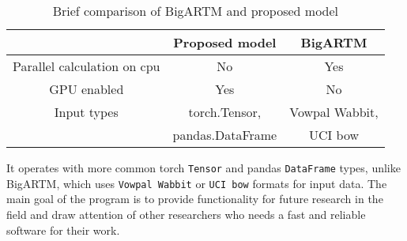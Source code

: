 \documentclass{article}
\begin{document}
\begin{table}[htbp]
\centering
    \begin{tabular}{|c|c|c|}
        \hline
         & Proposed model & BigARTM \\
        \hline
        Parallel calculation on cpu     & No                & Yes \\
        \hline
        GPU enabled                     & Yes               & No \\
        \hline
        Input types                     & torch.Tensor,     & Vowpal Wabbit, \\
                                        & pandas.DataFrame  & UCI bow \\
        \hline
    \end{tabular}
\caption{Brief comparison of BigARTM and proposed model}
\label{tab:model-comparison}
\end{table}

It operates with more common torch \texttt{Tensor} and pandas \texttt{DataFrame} types, unlike BigARTM, which uses \texttt{Vowpal Wabbit} or \texttt{UCI bow} formats for input data. The main goal of the program is to provide functionality for future research in the field and draw attention of other researchers who needs a fast and reliable software for their work.\\
\end{document}
